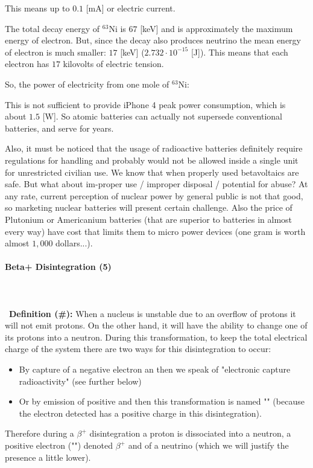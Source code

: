 	This means up to $0.1$ [mA] or electric current.
	
	The total decay energy of $^{63}\mathrm{Ni}$ is $67$ [keV] and is approximately the maximum energy of electron. But, since the decay also produces neutrino the mean energy of electron is much smaller: $17$ [keV] ($2.732\cdot 10^{-15}$ [J]).  This means that each electron has $17$ kilovolts of electric tension.
	
	So, the power of electricity from one mole of $^{63}\mathrm{Ni}$:
	
	This is not sufficient to provide iPhone 4 peak power consumption, which is about $1.5$ [W]. So atomic batteries can actually not supersede conventional batteries, and serve for years.
	
	Also, it must be noticed that the usage of radioactive batteries definitely require regulations for handling and probably would not be allowed inside a single unit for unrestricted civilian use. We know that when properly used betavoltaics are safe. But what about im-proper use / improper disposal / potential for abuse? At any rate, current perception of nuclear power by general public is not that good, so marketing nuclear batteries will present certain challenge. Also the price of Plutonium or Americanium batteries (that are superior to batteries in almost every way) have cost that limits them to micro power devices (one gram is worth almost $1,000$ dollars...).
	
	\paragraph{Beta+ Disintegration (5)}\mbox{}\\\\\
	\textbf{Definition (\#\mydef):} When a nucleus is unstable due to an overflow of protons it will not emit protons. On the other hand, it will have the ability to change one of its protons into a neutron. During this transformation, to keep the total electrical charge of the system there are two ways for this disintegration to occur: 
	\begin{itemize}
		\item By capture of a negative electron an then we speak of "electronic capture radioactivity" (see further below)

		\item Or by emission of positive and then this transformation is named "" (because the electron detected has a positive charge in this disintegration).
	\end{itemize}
	Therefore during a $\beta^{+}$ disintegration a proton is dissociated into a neutron, a positive electron ("") denoted $\beta^{+}$  and of a neutrino (which we will justify the presence a little lower).
	
